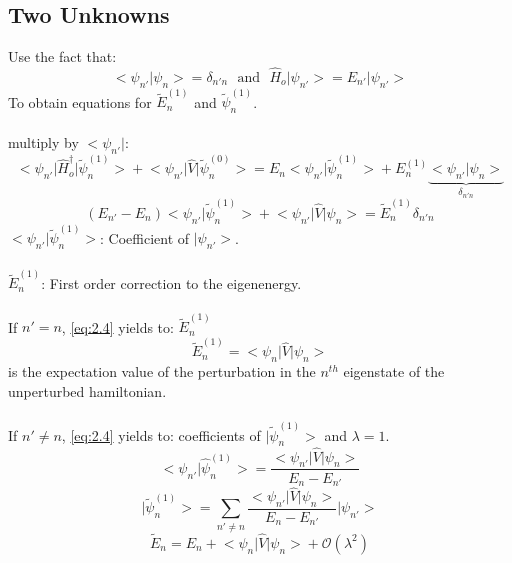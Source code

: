\documentclass[12pt]{article}
\begin{document}
\subsection{Two Unknowns}
Use the fact that:
\[\big< \psi_{n'} \big| \psi_n\big> = \delta_{n'n}\,\,\,\,\text{and}\,\,\,\,\hat{H}_o \big|\psi_{n'}
\big> = E_{n'} \big | \psi_{n'} \big>\]
To obtain equations for $\tilde{E}^{(1)}_n$ and $\tilde{\psi}^{(1)}_n$.\\
\\
multiply by $\big< \psi_{n'} \big|$: 
\begin{equation*}
	\big< \psi_{n'} \big|\hat{H}^\dag_o \big|\tilde{\psi}^{(1)}_n \big> + 
	\big< \psi_{n'} \big|\hat{V}\big| \tilde{\psi}^{(0)}_n \big> = 
	E_n \big< \psi_{n'} \big|\tilde{\psi}^{(1)}_n \big> + E^{(1)}_n \underbrace{\big< \psi_{n'}
	\big|\psi_n \big>}_{\delta_{n'n}} 
\end{equation*}
\begin{equation}
\label{eq:2.4}
	\left(E_{n'} - E_n\right)\big< \psi_{n'} \big|\tilde{\psi}^{(1)}_n \big> +
	\big< \psi_{n'} \big|\hat{V}\big| \psi_n \big> = \tilde{E}^{(1)}_n \delta_{n'n}
\end{equation}
$\big< \psi_{n'} \big|\tilde{\psi}^{(1)}_n \big>  $: Coefficient of $\big|\psi_{n'} \big>$.\\
\\
$\tilde{E}^{(1)}_n $: First order correction to the eigenenergy.
\\
\\
If $n'=n$, \ref{eq:2.4} yields to: $\tilde{E}^{{(1)}}_n$ 
\begin{equation*}
	\boxed{\tilde{E}^{(1)}_n =	\big< \psi_{n} \big|\hat{V}\big| \psi_n \big>  }
\end{equation*}
is the expectation value of the perturbation in the $n^{th}$ eigenstate of the unperturbed hamiltonian.
\\
\\
If $n'\neq n$, \ref{eq:2.4} yields to: coefficients of $\big | \tilde{\psi}^{(1)}_n\big>$ and $\lambda = 1$.
\begin{equation*}
	\big < \psi_{n'} |\hat{\psi}^{(1)}_n \big> = \frac{\big< \psi_{n'}\big|\hat{V}\big|\psi_n
	\big>}{E_n - E_{n'}}
\end{equation*}
\begin{equation*}
	\big|\tilde{\psi}^{(1)}_n \big> = \sum_{n' \neq n}
	\frac{\big< \psi_{n'}\big|\hat{V}\big|\psi_n\big>}{E_n - E_{n'}}\big|\psi_{n'}\big>
\end{equation*}
\begin{equation*}
	\tilde{E}_n = E_n +\big< \psi_{n}\big|\hat{V}\big|\psi_n\big> + \mathcal{O}(\lambda^2) 
\end{equation*}
\end{document}
